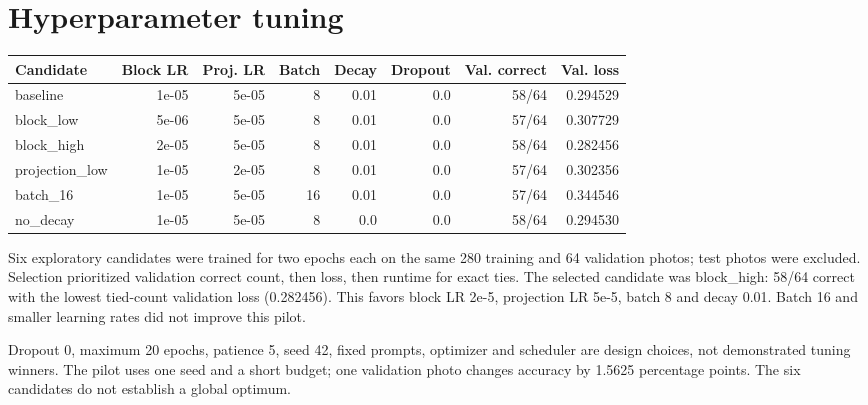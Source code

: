 \documentclass[10pt,a4paper]{article}
\begin{document}
\section*{Hyperparameter tuning}
\begin{center}\footnotesize\setlength{\tabcolsep}{4pt}
\begin{tabularx}{\linewidth}{Xrrrrrrr}
\toprule
Candidate & Block LR & Proj. LR & Batch & Decay & Dropout & Val. correct & Val. loss \\
\midrule
baseline & 1e-05 & 5e-05 & 8 & 0.01 & 0.0 & 58/64 & 0.294529 \\
block\_low & 5e-06 & 5e-05 & 8 & 0.01 & 0.0 & 57/64 & 0.307729 \\
block\_high & 2e-05 & 5e-05 & 8 & 0.01 & 0.0 & 58/64 & 0.282456 \\
projection\_low & 1e-05 & 2e-05 & 8 & 0.01 & 0.0 & 57/64 & 0.302356 \\
batch\_16 & 1e-05 & 5e-05 & 16 & 0.01 & 0.0 & 57/64 & 0.344546 \\
no\_decay & 1e-05 & 5e-05 & 8 & 0.0 & 0.0 & 58/64 & 0.294530 \\
\bottomrule\end{tabularx}\end{center}
Six exploratory candidates were trained for two epochs each on the same 280 training and 64 validation photos; test photos were excluded. Selection prioritized validation correct count, then loss, then runtime for exact ties. The selected candidate was block\_high: 58/64 correct with the lowest tied-count validation loss (0.282456). This favors block LR 2e-5, projection LR 5e-5, batch 8 and decay 0.01. Batch 16 and smaller learning rates did not improve this pilot.

Dropout 0, maximum 20 epochs, patience 5, seed 42, fixed prompts, optimizer and scheduler are design choices, not demonstrated tuning winners. The pilot uses one seed and a short budget; one validation photo changes accuracy by 1.5625 percentage points. The six candidates do not establish a global optimum.
\end{document}
